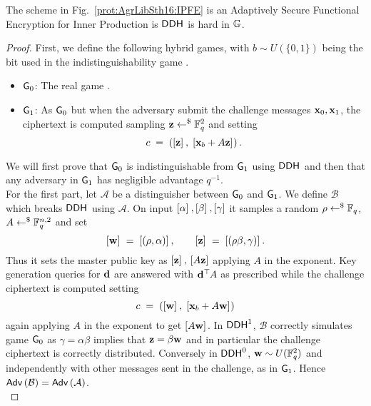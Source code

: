 \begin{proposition}
	The scheme in Fig.~\ref{prot:AgrLibSth16:IPFE} is an Adaptively Secure Functional Encryption for Inner Production is $\ddh$ is hard in $\G$.
\end{proposition}
\begin{proof}
	First, we define the following hybrid games, with $b \sim U(\{0, 1\})$ being the bit used in the indistinguishability game .
	\begin{itemize}
		\item $\cd{G}_0$: The real game .
		
		\item $\cd{G}_1$: As $\cd{G}_0$ but when the adversary submit the challenge messages $\vc{x}_0, \vc{x}_1$, the ciphertext is computed sampling $\vc{z} \rgets \F_q^2$ and setting
		\[
			c 
				\; = \; 
			\left( \gexp{}{\vc{z}}, \; \gexp{}{\vc{x}_b + A \vc{z}} \right).
		\]
	\end{itemize}
	We will first prove that $\cd{G}_0$ is indistinguishable from $\cd{G}_1$ using $\ddh$ and then that any adversary in $\cd{G}_1$ has negligible advantage $q^{-1}$.\\
	
	For the first part, let $\mathcal{A}$ be a distinguisher between $\cd{G}_0$ and $\cd{G}_1$. 
	We define $\mathcal{B}$ which breaks $\ddh$ using $\mathcal{A}$.
	On input $\gexp{}{\alpha}, \gexp{}{\beta}, \gexp{}{\gamma}$ it samples a random $\rho \rgets \F_q$, $A \rgets \F_q^{n, 2}$ and set
	\[
		\gexp{}{\vc{w}}
			\; = \;
		\gexp{}{(\rho, \alpha)}
			, \qquad
		\gexp{}{\vc{z}}
			\; = \;
		\gexp{}{(\rho\beta, \gamma)}.
	\]
	Thus it sets the master public key as $\gexp{}{\vc{z}}, \, \gexp{}{A \vc{z}}$ applying $A$ in the exponent.
	Key generation queries for $\vc{d}$ are answered with $\vc{d}^\trs A$ as prescribed while the challenge ciphertext is computed setting
	\[
		c 
			\; = \;
		\left( \gexp{}{\vc{w}}, \; \gexp{}{\vc{x}_b + A \vc{w}} \right)
	\]
	again applying $A$ in the exponent to get $\gexp{}{A \vc{w}}$.
	In $\ddh[1]$, $\mathcal{B}$ correctly simulates game $\cd{G}_0$ as $\gamma = \alpha \beta$ implies that $\vc{z} = \beta \vc{w}$ and in particular the challenge ciphertext is correctly distributed.
	Conversely in $\ddh[0]$, $\vc{w} \sim U(\F_q^2)$ and independently with other messages sent in the challenge, as in $\cd{G}_1$.
	Hence $\adv{\mathcal{B}} = \adv{\mathcal{A}}$.\\
	

\end{proof}
